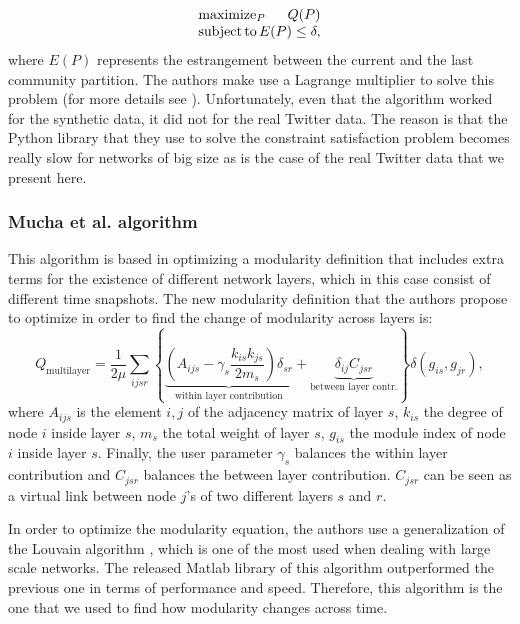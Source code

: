 \documentclass[12pt]{article}
\begin{document}
\begin{equation}
\begin{array}{l}
\operatorname*{maximize}_{P} \hfill Q(P)\\
\operatorname*{subject\, to} \hfill E(P) \le \delta,
\end{array} 
\label{eq.opt}
\end{equation}
where $E(P)$ represents the estrangement between the current
and the last community partition. The authors make use a Lagrange
multiplier to solve this problem (for more details see \cite{kawadia2012sequential}). Unfortunately, even that the algorithm
worked for the synthetic data, it did not for the real Twitter
data. The reason is that the Python library that
they use to solve the constraint satisfaction problem becomes really
slow for networks of big size as is the case of the real Twitter data
that we present here.

\subsubsection{Mucha et al. algorithm}

This algorithm is based in optimizing a modularity definition that
includes extra terms for the existence of different network layers,
which in this case consist of different time snapshots. The new
modularity definition that the authors propose to optimize
in order to find the change of modularity across layers is:
\begin{equation}
Q_{\text{multilayer}} = \frac{1}{2\mu} 
\sum_{ijsr} \left\{ \underbrace{ \left( 
A_{ijs}
 - \gamma_s \frac{k_{is} k_{js}}{2m_s}\right) \delta_{sr} 
 }_{\text{within layer contribution}}
 + \underbrace{\delta_{ij} C_{jsr}}_{\text{between layer contr.}}
 \right\} \delta(g_{is},g_{jr}),
\label{eq.q.layers}
\end{equation}
where $A_{ijs}$ is the element $i,j$ of the adjacency matrix of layer
$s$, $k_{is}$ the degree of node $i$ inside layer $s$, $m_s$ the
total weight of layer $s$, $g_{is}$ the module index of node $i$ inside
layer $s$. Finally, the user parameter $\gamma_s$ balances
the within layer contribution and $C_{jsr}$ balances the
between layer contribution. $C_{jsr}$ can be seen as a virtual
link between node $j$'s of two different layers $s$ and $r$.

In order to optimize the modularity equation, the authors use
a generalization of the Louvain algorithm \cite{blondel2008fast}, which
is one of the most used when dealing with large scale networks.
The released Matlab library of this algorithm outperformed
the previous one in terms of performance and speed. Therefore,
this algorithm is the one that we used to find how modularity
changes across time.
\end{document}
